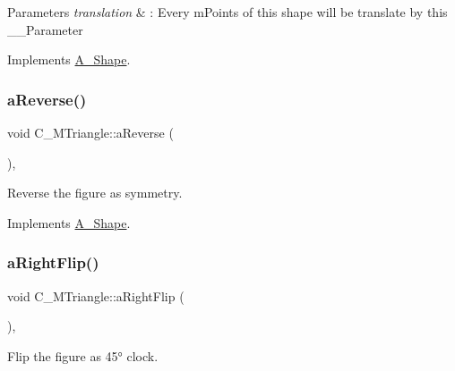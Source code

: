 \begin{DoxyParams}{Parameters}
{\em translation} & \+: Every m\+Points of this shape will be translate by this \+\_\+\+\_\+\+Parameter \\
\hline
\end{DoxyParams}


Implements \hyperlink{classA__Shape_ab284298db1b557ccfa7ba6de7a5fee2c}{A\+\_\+\+Shape}.

\mbox{\label{classC__MTriangle_a44614f4abb94f1a5f963cfb3e8fce7a5}} 
\subsubsection{\texorpdfstring{a\+Reverse()}{aReverse()}}
{\footnotesize\ttfamily void C\+\_\+\+M\+Triangle\+::a\+Reverse (\begin{DoxyParamCaption}{ }\end{DoxyParamCaption})\hspace{0.3cm}{\ttfamily [override]}, {\ttfamily [virtual]}}



Reverse the figure as symmetry. 



Implements \hyperlink{classA__Shape_afe2c7969d647f6358da13879a7534ecb}{A\+\_\+\+Shape}.

\mbox{\label{classC__MTriangle_aa3a1fc0604fa7e13b6c89d242357a163}} 
\subsubsection{\texorpdfstring{a\+Right\+Flip()}{aRightFlip()}}
{\footnotesize\ttfamily void C\+\_\+\+M\+Triangle\+::a\+Right\+Flip (\begin{DoxyParamCaption}{ }\end{DoxyParamCaption})\hspace{0.3cm}{\ttfamily [override]}, {\ttfamily [virtual]}}



Flip the figure as 45° clock. 



